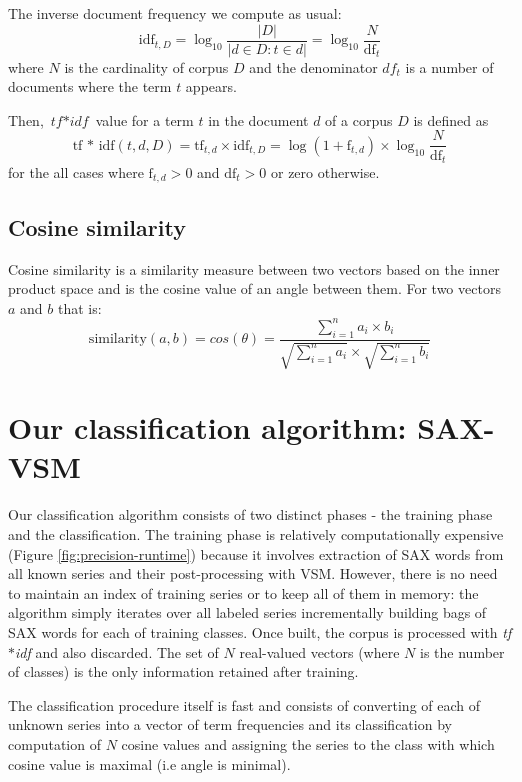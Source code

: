 \documentclass{llncs}
\begin{document}
The inverse document frequency we compute as usual:
\begin{equation}
 \mbox{idf}_{t, D} =  \log_{10}\frac{|D|}{|d \in D : t \in d|} = \log_{10}\frac{N}{\mbox{df}_{t}}
\end{equation} 
where $N$ is the cardinality of corpus $D$ and the denominator $df_{t}$ is a number of documents
where the term $t$ appears.

Then, $\textit{tf$\ast$idf}$ value for a term $t$ in the document $d$ of a corpus $D$ is defined as 
\begin{equation}
 \mbox{tf * idf}(t, d, D) =  \mbox{tf}_{t, d} \times \mbox{idf}_{t, D} = \log(1 + \mbox{f}_{t,d})
\times \log_{10}\frac{N}{\mbox{df}_{t}}
\end{equation} 
for the all cases where $\mbox{f}_{t,d}>0$ and $\mbox{df}_{t}>0$ or zero otherwise.

\subsection{Cosine similarity}
Cosine similarity is a similarity measure between two vectors based on the inner product space
and is the cosine value of an angle between them. For two vectors $a$ and $b$ that is:
\begin{equation}
 \mbox{similarity}(a,b) = cos(\theta) = \frac{ \sum\limits^{n}_{i=1} a_{i} \times b_{i} }{
\sqrt{\sum\limits^{n}_{i=1} a_{i}} \times \sqrt{\sum\limits^{n}_{i=1} b_{i}} }
\end{equation} 


\section{Our classification algorithm: SAX-VSM}
Our classification algorithm consists of two distinct phases - the training phase and the
classification. The training phase is relatively computationally expensive (Figure
\ref{fig:precision-runtime}) because it involves extraction of SAX words from all known series and
their post-processing with VSM. However, there is no need to maintain an index of training series or
to keep all of them in memory: the algorithm simply iterates over all labeled series incrementally
building bags of SAX words for each of training classes. Once built, the corpus is processed with
\textit{tf$\ast$idf} and also discarded. The set of $N$ real-valued vectors (where $N$ is the number
of classes) is the only information retained after training.

The classification procedure itself is fast and consists of converting of each of unknown series
into a vector of term frequencies and its classification by computation of $N$ cosine values
and assigning the series to the class with which cosine value is maximal (i.e angle is minimal).
\end{document}
